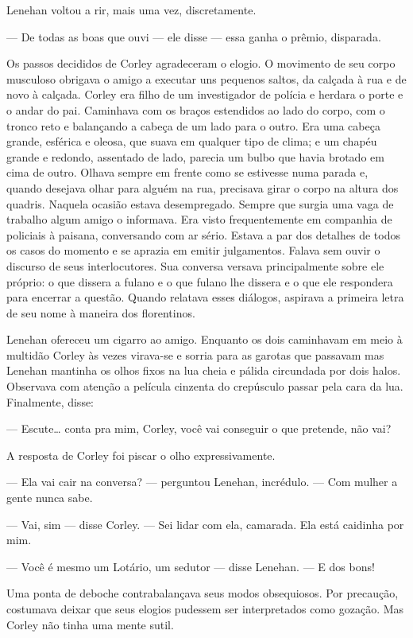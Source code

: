 Lenehan voltou a rir, mais uma vez, discretamente.

--- De todas as boas que ouvi --- ele disse --- essa ganha o prêmio, disparada.

Os passos decididos de Corley agradeceram o elogio.  O movimento de seu corpo
musculoso obrigava o amigo a executar uns pequenos saltos, da calçada à rua e
de novo à calçada.  Corley era filho de um investigador de polícia e herdara o
porte e o andar do pai.  Caminhava com os braços estendidos ao lado do corpo,
com o tronco reto e balançando a cabeça de um lado para o outro.  Era uma
cabeça grande, esférica e oleosa, que suava em qualquer tipo de clima; e um
chapéu grande e redondo, assentado de lado, parecia um bulbo que havia brotado
em cima de outro.  Olhava sempre em frente como se estivesse numa parada e,
quando desejava olhar para alguém na rua, precisava girar o corpo na altura dos
quadris.  Naquela ocasião estava desempregado.  Sempre que surgia uma vaga de
trabalho algum amigo o informava.  Era visto frequentemente em companhia de
policiais à paisana, conversando com ar sério.  Estava a par dos detalhes de
todos os casos do momento e se aprazia em emitir julgamentos.  Falava sem ouvir
o discurso de seus interlocutores.  Sua conversa versava principalmente sobre
ele próprio: o que dissera a fulano e o que fulano lhe dissera e o que ele
respondera para encerrar a questão.  Quando relatava esses diálogos, aspirava a
primeira letra de seu nome à maneira dos florentinos.

Lenehan ofereceu um cigarro ao amigo.  Enquanto os dois caminhavam em meio à
multidão Corley às vezes virava-se e sorria para as garotas que passavam mas
Lenehan mantinha os olhos fixos na lua cheia e pálida circundada por dois
halos.  Observava com atenção a película cinzenta do crepúsculo passar pela
cara da lua.  Finalmente, disse:

--- Escute\ldots{} conta pra mim, Corley, você vai conseguir o que pretende,
não vai?

A resposta de Corley foi piscar o olho expressivamente.

--- Ela vai cair na conversa? --- perguntou Lenehan, incrédulo.  --- Com mulher
a gente nunca sabe.

--- Vai, sim --- disse Corley.  --- Sei lidar com ela, camarada.  Ela está
caidinha por mim.

--- Você é mesmo um Lotário, um sedutor --- disse Lenehan.  --- E dos bons!

Uma ponta de deboche contrabalançava seus modos obsequiosos.  Por precaução,
costumava deixar que seus elogios pudessem ser interpretados como gozação.  Mas
Corley não tinha uma mente sutil.

